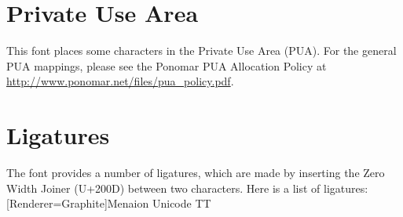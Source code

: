 \section{Private Use Area}
This font places some characters in the Private Use Area (PUA). For the general PUA mappings, please see the Ponomar PUA Allocation Policy at \url{http://www.ponomar.net/files/pua_policy.pdf}.

\section{Ligatures}

The font provides a number of ligatures, which are made by inserting the Zero Width Joiner (U+200D) between two characters. Here is a list of ligatures:
\newfontfamily{\graph}[Renderer=Graphite]{Menaion Unicode TT}

